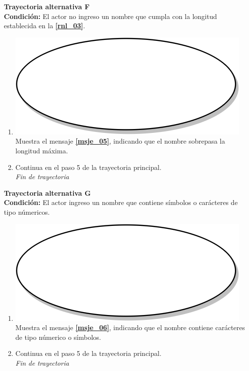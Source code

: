 \textbf{Trayectoria alternativa F} \label{cu2_ta_f}\\
\textbf{Condición:} El actor no ingreso un nombre que cumpla con la longitud establecida en la \textbf{\ref{rnl_03}}.\\
 \begin{enumerate}[label=F\arabic*]
    \item {\includegraphics[scale=.05]{Capitulo3/img/proceso.png} Muestra el mensaje \textbf{\ref{msje_05}}, indicando que el nombre sobrepasa la longitud máxima.}
    \item {Continua en el paso 5 de la trayectoria principal.} \\
    \textit{Fin de trayectoria} \\
\end{enumerate}

\textbf{Trayectoria alternativa G} \label{cu2_ta_g}\\
\textbf{Condición:} El actor ingreso un nombre que contiene símbolos o carácteres de tipo númericos.\\
 \begin{enumerate}[label=G\arabic*]
    \item {\includegraphics[scale=.05]{Capitulo3/img/proceso.png} Muestra el mensaje \textbf{\ref{msje_06}}, indicando que el nombre contiene carácteres de tipo númerico o símbolos.}
    \item {Continua en el paso 5 de la trayectoria principal.} \\
    \textit{Fin de trayectoria} \\
\end{enumerate}


